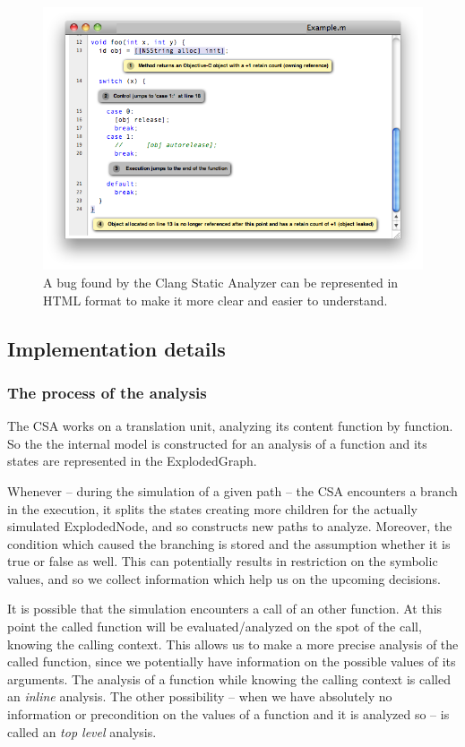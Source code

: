 \begin{figure}[h]
	\centering
	\includegraphics[width=1\textwidth]{img/view}
	\caption{A bug found by the Clang Static Analyzer can be represented in 
	HTML format to make it more clear and easier to understand.}
	\label{fig:hibak_megjelenitese}
\end{figure}

\subsection{Implementation details}
\subsubsection{The process of the analysis}
The CSA works on a translation unit, analyzing its content function by 
function. So the the internal model is constructed for an analysis of a 
function and its states are represented in the ExplodedGraph.

Whenever -- during the simulation of a given path -- the CSA encounters a 
branch in the execution, it splits the states creating more children for the 
actually simulated ExplodedNode, and so constructs new paths to analyze. 
Moreover, the condition which caused the branching is stored and the assumption 
whether it is true or false as well. This can potentially results in 
restriction on the symbolic values, and so we collect information which help us 
on the upcoming decisions. 

It is possible that the simulation encounters a call of an other function.
At this point the called function will be evaluated/analyzed on the spot of the 
call, knowing the calling context. This allows us to make a more precise 
analysis of the called function, since we potentially have information on the 
possible values of its arguments. The analysis of a function while knowing the 
calling context is called an \textit{inline} analysis. The other possibility -- 
when we have absolutely no information or precondition on the values of a 
function and it is analyzed so -- is called an \textit{top level} analysis.

